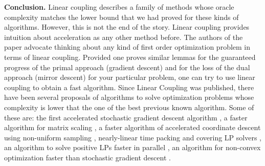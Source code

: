 \textbf{Conclusion.} Linear coupling describes a family of methods whose oracle complexity matches the lower bound that we had proved for these kinds of algorithms. However, this is not the end of the story. Linear coupling provides intuition about acceleration as any other method before. The authors of the paper advocate thinking about any kind of first order optimization problem in terms of linear coupling. Provided one proves similar lemmas for the guaranteed progress of the primal approach (gradient descent) and for the loss of the dual approach (mirror descent) for your particular problem, one can try to use linear coupling to obtain a fast algorithm. Since Linear Coupling was published, there have been several proposals of algorithms to solve optimization problems whose complexity is lower that the one of the best previous known algorithm. Some of these are: the first accelerated stochastic gradient descent algorithm \cite{allen2016katyusha}, a faster algorithm for matrix scaling \cite{allen2017much}, a faster algorithm of accelerated coordinate descent using non-uniform sampling \cite{allen2016even}, nearly-linear time packing and covering LP solvers \cite{allen2014nearly}, an algorithm to solve positive LPs faster in parallel \cite{allen2014using}, an algorithm for non-convex optimization faster than stochastic gradient descent \cite{allen2017natasha}.
